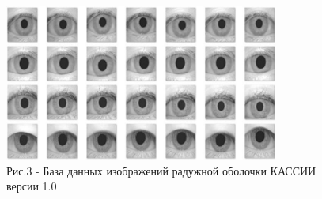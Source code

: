 \begin{figure}[H]
	\centering
	\includegraphics[width=0.8\textwidth]{assets/85}
	\caption*{Рис.3 - База данных изображений радужной оболочки КАССИИ версии 1.0}
\end{figure}

